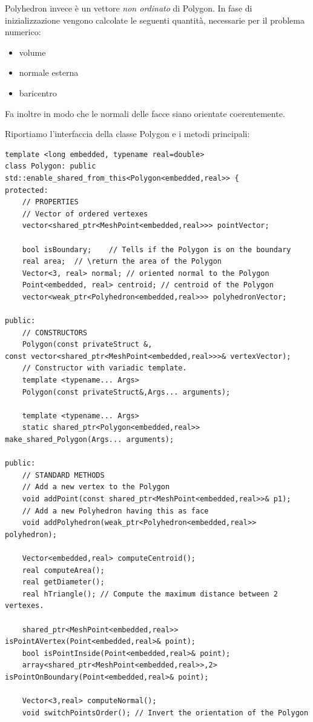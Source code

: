 \documentclass[oneside,12pt]{book}  %
\theoremstyle{plain}
\theoremstyle{definition}
\theoremstyle{remark}
\numberwithin{equation}{chapter} %
\begin{document}
 Polyhedron invece \`e un vettore \textit{non ordinato} di Polygon. 
In fase di inizializzazione vengono calcolate le seguenti quantit\`a, 
necessarie per il problema numerico:
\begin{itemize}
\item volume 
\item normale esterna
\item baricentro
\end{itemize}
Fa inoltre in modo che le normali delle facce siano orientate
coerentemente.

Riportiamo l'interfaccia della classe Polygon e i metodi principali:

\begin{verbatim}
template <long embedded, typename real=double>
class Polygon: public std::enable_shared_from_this<Polygon<embedded,real>> {
protected:
    // PROPERTIES
    // Vector of ordered vertexes
    vector<shared_ptr<MeshPoint<embedded,real>>> pointVector;
	
    bool isBoundary;	// Tells if the Polygon is on the boundary
    real area;	// \return the area of the Polygon
    Vector<3, real> normal;	// oriented normal to the Polygon
    Point<embedded, real> centroid;	// centroid of the Polygon
    vector<weak_ptr<Polyhedron<embedded,real>>> polyhedronVector;

public:
    // CONSTRUCTORS
    Polygon(const privateStruct &,
const vector<shared_ptr<MeshPoint<embedded,real>>>& vertexVector);
    // Constructor with variadic template.
    template <typename... Args>
    Polygon(const privateStruct&,Args... arguments);

    template <typename... Args>
    static shared_ptr<Polygon<embedded,real>> make_shared_Polygon(Args... arguments);

public:
    // STANDARD METHODS
    // Add a new vertex to the Polygon
    void addPoint(const shared_ptr<MeshPoint<embedded,real>>& p1); 
    // Add a new Polyhedron having this as face
    void addPolyhedron(weak_ptr<Polyhedron<embedded,real>> polyhedron);	
			
    Vector<embedded,real> computeCentroid();
    real computeArea();
    real getDiameter();
    real hTriangle(); // Compute the maximum distance between 2 vertexes.

    shared_ptr<MeshPoint<embedded,real>> isPointAVertex(Point<embedded,real>& point);	
    bool isPointInside(Point<embedded,real>& point);
    array<shared_ptr<MeshPoint<embedded,real>>,2> 
isPointOnBoundary(Point<embedded,real>& point);

    Vector<3,real> computeNormal();
    void switchPointsOrder(); // Invert the orientation of the Polygon

\end{verbatim}
\end{document}
